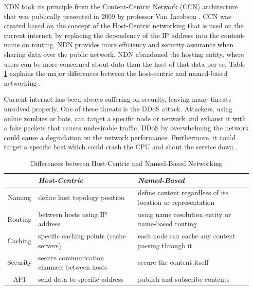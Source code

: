 \documentclass[conference]{IEEEtran}
\begin{document}
NDN took its principle from the Content-Centric Network (CCN) architecture that was publically presented in 2009 by professor Van Jacobson \cite{Jacobson:2009:NNC:1658939.1658941}\cite{Jacobson2012}\cite{Fukuda2009}. CCN was created based on the concept of the Host-Centric networking that is used on the current internet; by replacing the dependency of the IP address into the content-name on routing. NDN provides more efficiency and security assurance when sharing data over the public network. NDN abandoned the hosting entity, where users can be more concerned about data than the host of that data per se. Table \ref{tab1} explains the major differences between the host-centric and named-based networking \cite{Abdallah2015}. 

Current internet has been always suffering on security, leaving many threats unsolved properly. One of these threats is the DDoS attack. Attackers, using online zombies or bots, can target a specific node or network and exhaust it with a fake packets that causes undesirable traffic. DDoS by overwhelming the network could cause a degradation on the network performance. Furthermore, it could target a specific host which could crash the CPU and shout the service down \cite{6496396}.

\begin{table}[htbp]
\caption{Differences between Host-Centric and Named-Based Networking}
\begin{center}
\begin{tabular}{|c|p{3cm}|p{3.5cm}|}
\hline
{}&\textbf{\textit{Host-Centric}}& \textbf{\textit{Named-Based}} \\
\hline
{Naming}& define host topology position & define content regardless of its location or representation \\
\hline
{Routing}& between hosts using IP address & using name resolution entity or name-based routing  \\
\hline
{Caching}& specific caching points (cache servers) & each node can cache any content passing through it   \\
\hline
{Security}& secure communication channels between hosts & secure the content itself   \\
\hline
{API}& send data to specific address & publish and subscribe contents  \\
\hline
\end{tabular}
\label{tab1}
\end{center}
\end{table}
\end{document}
